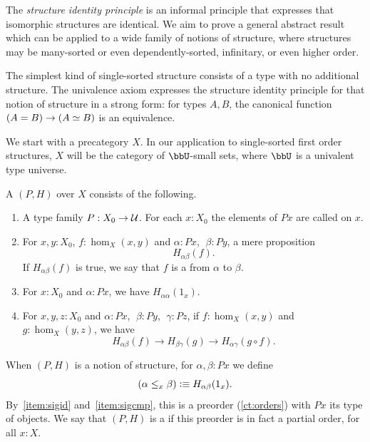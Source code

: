 The \emph{structure identity principle} is an informal principle
that expresses that isomorphic structures are identical.  We aim to
prove a general abstract result which can be applied to a wide family
of notions of structure, where structures may be many-sorted or even
dependently-sorted, infinitary, or even higher order.

The simplest kind of single-sorted structure consists of a type with
no additional structure.  The univalence axiom expresses the structure identity principle for that
notion of structure in a strong form: for types $A,B$, the
canonical function $(A=B)\to (A \simeq B)$ is an equivalence.

We start with a precategory $X$.  In our application to
single-sorted first order structures, $X$ will be the category %
of $\bbU$-small sets, where $\bbU$ is a univalent type universe.

\begin{defn}\label{ct:sig}
  A 
  $(P,H)$ over $X$ consists of the following.
  \begin{enumerate}
  \item A type family $P:X_0 \to \mathcal{U}$.
    For each $x:X_0$ the elements of $Px$ are called 
    on $x$.
  \item For $x,y:X_0$, $f:\hom_X(x,y)$ and $\alpha:Px$, $\;\beta:Py$, a mere proposition
  \[ H_{\alpha\beta}(f).\]
    If $H_{\alpha\beta}(f)$ is true, we say that $f$ is a 
    from $\alpha$ to $\beta$.
  \item For $x:X_0$ and $\alpha:Px$, we have $H_{\alpha\alpha}(1_x)$.\label{item:sigid}
  \item For $x,y,z:X_0$ and $\alpha:Px$, $\;\beta:Py$, $\;\gamma:Pz$,
if $f:\hom_X(x,y)$ and $g:\hom_X(y,z)$, we have\label{item:sigcmp}
  \[ H_{\alpha\beta}(f)\to H_{\beta\gamma}(g)\to H_{\alpha\gamma}(g\circ   f).\]
   \end{enumerate}
  When $(P,H)$ is a notion of structure, for $\alpha,\beta:Px$ we define
  \[ (\alpha\leq_x\beta) \vcentcolon\equiv H_{\alpha\beta}(1_x).\]
  By~\ref{item:sigid} and~\ref{item:sigcmp}, this is a preorder (\cref{ct:orders}) with $Px$ its type of objects.
  We say that $(P,H)$ is a 
  if this preorder is in fact a partial order, for all $x:X$.
\end{defn}

